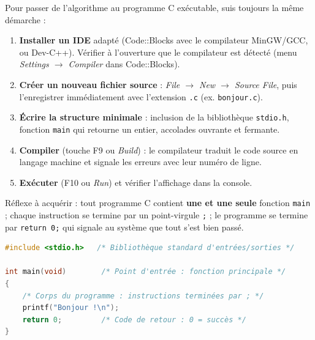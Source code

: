 \documentclass[11pt]{article}
\begin{document}
\begin{methode}
Pour passer de l'algorithme au programme C exécutable, suis toujours la même démarche :
\begin{enumerate}
\item \textbf{Installer un IDE} adapté (Code::Blocks avec le compilateur MinGW/GCC, ou Dev-C++). Vérifier à l'ouverture que le compilateur est détecté (menu \emph{Settings $\to$ Compiler} dans Code::Blocks).
\item \textbf{Créer un nouveau fichier source} : \emph{File $\to$ New $\to$ Source File}, puis l'enregistrer immédiatement avec l'extension \texttt{.c} (ex. \texttt{bonjour.c}).
\item \textbf{Écrire la structure minimale} : inclusion de la bibliothèque \texttt{stdio.h}, fonction \texttt{main} qui retourne un entier, accolades ouvrante et fermante.
\item \textbf{Compiler} (touche F9 ou \emph{Build}) : le compilateur traduit le code source en langage machine et signale les erreurs avec leur numéro de ligne.
\item \textbf{Exécuter} (F10 ou \emph{Run}) et vérifier l'affichage dans la console.
\end{enumerate}
Réflexe à acquérir : tout programme C contient \textbf{une et une seule} fonction \texttt{main} ; chaque instruction se termine par un point-virgule \texttt{;} ; le programme se termine par \texttt{return 0;} qui signale au système que tout s'est bien passé.
\end{methode}

\begin{exemplebox}
\begin{lstlisting}[language=C]
#include <stdio.h>   /* Bibliothèque standard d'entrées/sorties */

int main(void)        /* Point d'entrée : fonction principale */
{
    /* Corps du programme : instructions terminées par ; */
    printf("Bonjour !\n");
    return 0;         /* Code de retour : 0 = succès */
}
\end{lstlisting}
\end{exemplebox}
\end{document}
